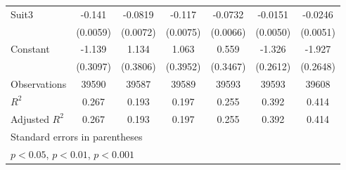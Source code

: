 {\begin{tabular}{l*{6}{c}}
\addlinespace
Suit3               &      -0.141\sym{***}&     -0.0819\sym{***}&      -0.117\sym{***}&     -0.0732\sym{***}&     -0.0151\sym{**} &     -0.0246\sym{***}\\
                    &    (0.0059)         &    (0.0072)         &    (0.0075)         &    (0.0066)         &    (0.0050)         &    (0.0051)         \\
\addlinespace
Constant            &      -1.139\sym{***}&       1.134\sym{**} &       1.063\sym{**} &       0.559         &      -1.326\sym{***}&      -1.927\sym{***}\\
                    &    (0.3097)         &    (0.3806)         &    (0.3952)         &    (0.3467)         &    (0.2612)         &    (0.2648)         \\
\midrule
Observations        &       39590         &       39587         &       39589         &       39593         &       39593         &       39608         \\
\(R^{2}\)           &       0.267         &       0.193         &       0.197         &       0.255         &       0.392         &       0.414         \\
Adjusted \(R^{2}\)  &       0.267         &       0.193         &       0.197         &       0.255         &       0.392         &       0.414         \\
\bottomrule
\multicolumn{7}{l}{\footnotesize Standard errors in parentheses}\\
\multicolumn{7}{l}{\footnotesize \sym{*} \(p<0.05\), \sym{**} \(p<0.01\), \sym{***} \(p<0.001\)}\\
\end{tabular}
}
